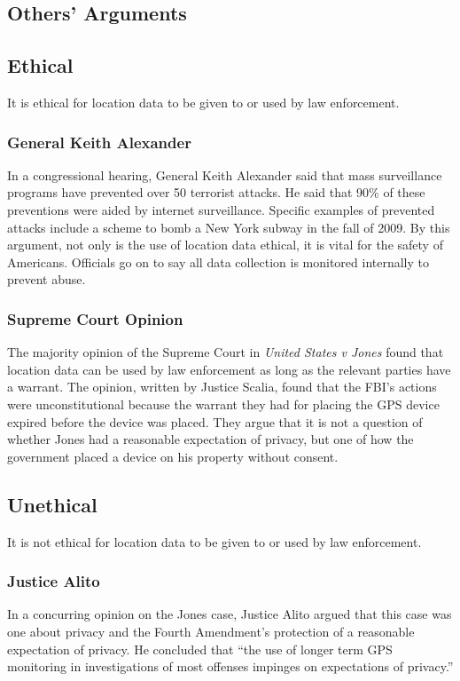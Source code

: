 \documentclass[12pt]{article}
\begin{document}
\begin{multicols}{2}
\section{Others' Arguments}
\subsection{Ethical}
It is ethical for location data to be given to or used by law enforcement.
\subsubsection{General Keith Alexander}
In a congressional hearing, General Keith Alexander said that mass
surveillance programs have prevented over 50 terrorist attacks. \cite{huffingtonsurveillance}
He said that 90\% of these preventions were aided by internet surveillance. \cite{huffingtonsurveillance} 
Specific examples of prevented attacks include a scheme to bomb a New York subway in the fall of 2009. \cite{huffingtonsurveillance}
By this argument, not only is the use of location data ethical, it is vital for the safety of Americans.
Officials go on to say all data collection is monitored internally to prevent abuse. \cite{huffingtonsurveillance}
\subsubsection{Supreme Court Opinion}
The majority opinion of the Supreme Court in \textit{United States v Jones} found that location data can be used by law enforcement as long as the relevant parties have a warrant. \cite{usvjonesopinions}
The opinion, written by Justice Scalia, found that the FBI's actions were unconstitutional because the warrant they had for placing the GPS device expired before the device was placed. They argue that it is not a question of whether Jones had a reasonable expectation of privacy, but one of how the government placed a device on his property without consent. \cite{usvjonesopinions}
\subsection{Unethical}
It is not ethical for location data to be given to or used by law enforcement.
\subsubsection{Justice Alito}
In a concurring opinion on the Jones case, Justice Alito argued that this case was one about privacy and the Fourth Amendment's protection of a reasonable expectation of privacy. \cite{usvjonesopinions}
He concluded that ``the use of longer term GPS monitoring in investigations of most offenses impinges on expectations of privacy.''\cite{washingtonpost}

\end{multicols}
\end{document}
